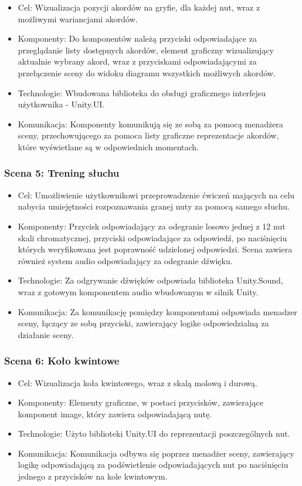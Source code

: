 \begin{itemize}
\item Cel: Wizualizacja pozycji akordów na gryfie, dla każdej nut, wraz z możliwymi wariancjami akordów.
\item Komponenty: Do komponentów należą przyciski odpowiadające za przeglądanie listy dostępnych akordów, element graficzny wizualizujący aktualnie wybrany akord, wraz z przyciskami odpowiadającymi za przełączenie sceny do widoku diagramu wszystkich możliwych akordów.
\item Technologie: Wbudowana biblioteka do obsługi graficznego interfejsu użytkownika - Unity.UI.
\item Komunikacja: Komponenty komunikują się ze sobą za pomocą menadżera sceny, przechowującego za pomoca listy graficzne reprezentacje akordów, które wyświetlane są w odpowiednich momentach. 
\end{itemize}

\subsubsection{Scena 5: Trening słuchu}

\begin{itemize}
\item Cel: Umożliwienie użytkownikowi przeprowadzenie ćwiczeń mających na celu nabycia umiejętności rozpoznawania granej nuty za pomocą samego słuchu.
\item Komponenty: Przycisk odpowiadający za odegranie losowo jednej z 12 nut skali chromatycznej, przyciski odpowiadające za odpowiedź, po naciśnięciu których weryfikowana jest poprawność udzielonej odpowiedzi. Scena zawiera również system audio odpowiadający za odegranie dźwięku.
\item Technologie: Za odgrywanie dźwięków odpowiada biblioteka Unity.Sound, wraz z gotowym komponentem audio wbudowanym w silnik Unity.
\item Komunikacja: Za komunikację pomiędzy komponentami odpowiada menadzer sceny, łączący ze sobą przyciski, zawierający logike odpowiedzialną za działanie sceny.
\end{itemize}

\subsubsection{Scena 6: Koło kwintowe}

\begin{itemize}
	\item Cel: Wizualizacja koła kwintowego, wraz z skalą molową i durową.
	\item Komponenty: Elementy graficzne, w postaci przycisków, zawierające komponent image, który zawiera odpowiadającą nutę.
	\item Technologie: Użyto biblioteki Unity.UI do reprezentacji poszczególnych nut.
	\item Komunikacja: Komunikacja odbywa się poprzez menadżer sceny, zawierający logikę odpowiadającą za podświetlenie odpowiadających nut po naciśnięciu jednego z przycisków na kole kwintowym.
\end{itemize}


